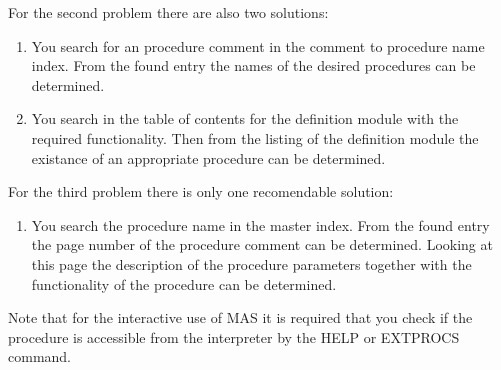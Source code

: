 For the second problem there are also two solutions:
\begin{enumerate}
\item You search for an procedure comment in the  
      comment to procedure name index. 
      From the found entry the names of the desired 
      procedures can be determined.
\item You search in the table of contents 
      for the definition module with the required functionality.
      Then from the listing of the definition module
      the existance of an appropriate procedure 
      can be determined. 
\end{enumerate}

For the third problem there is only one recomendable  
solution:
\begin{enumerate}
\item You search the procedure name in the 
      master index. 
      From the found entry the page number of the 
      procedure comment can be determined. 
      Looking at this page the description of 
      the procedure parameters together with  
      the functionality of the procedure can be determined.
\end{enumerate}

Note that for the interactive use of MAS it is required that 
you check if the procedure is accessible from the 
interpreter by the HELP or EXTPROCS command.

